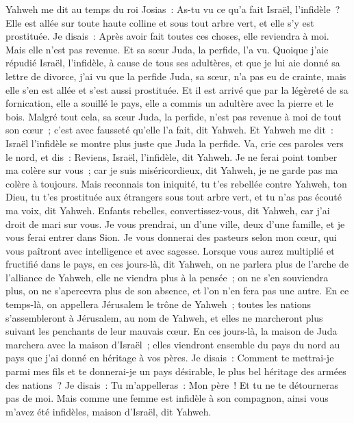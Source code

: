 \begin{multicols}{2}
Yahweh me dit au temps du roi Josias~: As-tu vu ce qu'a fait Israël, l'infidèle~? Elle est allée sur toute haute colline et sous tout arbre vert, et elle s'y est prostituée.
Je disais~: Après avoir fait toutes ces choses, elle reviendra à moi. Mais elle n'est pas revenue. Et sa sœur Juda, la perfide, l'a vu.
Quoique j'aie répudié Israël, l'infidèle, à cause de tous ses adultères, et que je lui aie donné sa lettre de divorce, j'ai vu que la perfide Juda, sa sœur, n'a pas eu de crainte, mais elle s'en est allée et s'est aussi prostituée.
Et il est arrivé que par la légèreté de sa fornication, elle a souillé le pays, elle a commis un adultère avec la pierre et le bois.
Malgré tout cela, sa sœur Juda, la perfide, n'est pas revenue à moi de tout son cœur~; c'est avec fausseté qu'elle l'a fait, dit Yahweh.
Et Yahweh me dit~: Israël l'infidèle se montre plus juste que Juda la perfide.
Va, crie ces paroles vers le nord, et dis~: Reviens, Israël, l'infidèle, dit Yahweh. Je ne ferai point tomber ma colère sur vous~; car je suis miséricordieux, dit Yahweh, je ne garde pas ma colère à toujours.
Mais reconnais ton iniquité, tu t'es rebellée contre Yahweh, ton Dieu, tu t'es prostituée aux étrangers sous tout arbre vert, et tu n'as pas écouté ma voix, dit Yahweh.
Enfants rebelles, convertissez-vous, dit Yahweh, car j'ai droit de mari sur vous. Je vous prendrai, un d'une ville, deux d'une famille, et je vous ferai entrer dans Sion.
Je vous donnerai des pasteurs selon mon cœur, qui vous paîtront avec intelligence et avec sagesse.
Lorsque vous aurez multiplié et fructifié dans le pays, en ces jours-là, dit Yahweh, on ne parlera plus de l'arche de l'alliance de Yahweh, elle ne viendra plus à la pensée~; on ne s'en souviendra plus, on ne s'apercevra plus de son absence, et l'on n'en fera pas une autre.
En ce temps-là, on appellera Jérusalem le trône de Yahweh~; toutes les nations s'assembleront à Jérusalem, au nom de Yahweh, et elles ne marcheront plus suivant les penchants de leur mauvais cœur.
En ces jours-là, la maison de Juda marchera avec la maison d'Israël~; elles viendront ensemble du pays du nord au pays que j'ai donné en héritage à vos pères.
Je disais~: Comment te mettrai-je parmi mes fils et te donnerai-je un pays désirable, le plus bel héritage des armées des nations~? Je disais~: Tu m'appelleras~: Mon père~! Et tu ne te détourneras pas de moi.
Mais comme une femme est infidèle à son compagnon, ainsi vous m'avez été infidèles, maison d'Israël, dit Yahweh.

\end{multicols}

